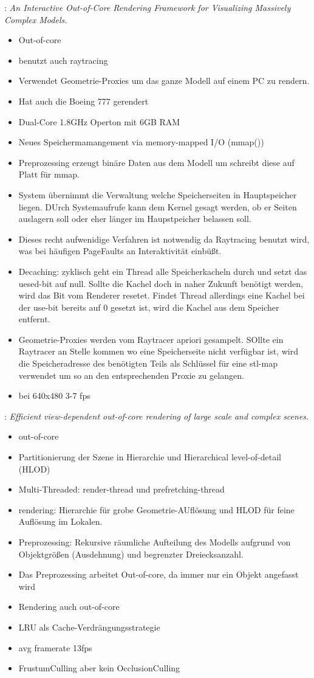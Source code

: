 \cite{wald}: \textit{An Interactive Out-of-Core Rendering Framework for Visualizing Massively Complex Models.}
\begin{itemize}
 \item Out-of-core
 \item benutzt auch raytracing
 \item Verwendet Geometrie-Proxies um das ganze Modell auf einem PC zu rendern.
 \item Hat auch die Boeing 777 gerendert
 \item Dual-Core 1.8GHz Operton mit 6GB RAM
 \item Neues Speichermamangement via memory-mapped I/O (mmap())
 \item Preprozessing erzeugt binäre Daten aus dem Modell um schreibt diese auf Platt für mmap.
 \item System übernimmt die Verwaltung welche Speicherseiten in Hauptspeicher liegen. DUrch Systemaufrufe kann dem Kernel gesagt werden, ob er Seiten auslagern soll oder eher länger im Haupstpeicher belassen soll.
 \item Dieses recht aufwenidige Verfahren ist notwendig da Raytracing benutzt wird, was bei häufigen PageFaults an Interaktivität einbüßt.
 \item Decaching: zyklisch geht ein Thread alle Speicherkacheln durch und setzt das uesed-bit auf null. Sollte die Kachel doch in naher Zukunft benötigt werden, wird das Bit vom Renderer resetet. Findet Thread allerdings eine Kachel bei der use-bit bereits auf 0 gesetzt ist, wird die Kachel aus dem Speicher entfernt.
 \item Geometrie-Proxies werden vom Raytracer apriori gesampelt. SOllte ein Raytracer an Stelle kommen wo eine Speicherseite nicht verfügbar ist, wird die Speicheradresse des benötigten Teils als Schlüssel für eine stl-map verwendet um so an den entsprechenden Proxie zu gelangen.
 \item bei 640x480 3-7 fps
\end{itemize}

\cite{gao}: \textit{Efficient view-dependent out-of-core rendering of large scale and complex scenes.}
\begin{itemize}
 \item out-of-core
 \item Partitionierung der Szene in Hierarchie und Hierarchical level-of-detail (HLOD)
 \item Multi-Threaded: render-thread und prefretching-thread
 \item rendering: Hierarchie für grobe Geometrie-AUflösung und HLOD für feine Auflösung im Lokalen.
 \item Preprozessing: Rekursive räumliche Aufteilung des Modells aufgrund von Objektgrößen (Ausdehnung) und begrenzter Dreiecksanzahl.
 \item Das Preprozessing arbeitet Out-of-core, da immer nur ein Objekt angefasst wird
 \item Rendering auch out-of-core
 \item LRU als Cache-Verdrängungsstrategie
 \item avg framerate 13fps
 \item FrustumCulling aber kein OcclusionCulling
\end{itemize}

